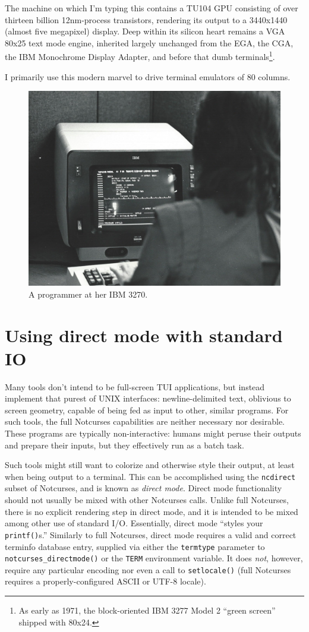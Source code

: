 \documentclass[letterpaper,10pt]{article}
\begin{document}
The machine on which I'm typing this contains a
TU104 GPU consisting of over thirteen billion 12nm-process transistors,
rendering its output to a 3440x1440 (almost five megapixel) display. Deep
within its silicon heart remains a VGA 80x25 text mode engine, inherited
largely unchanged from the EGA, the CGA, the IBM Monochrome Display Adapter,
and before that dumb terminals\footnote{As early as 1971, the block-oriented
IBM 3277 Model 2 ``green screen'' shipped with 80x24.}.


I primarily use this modern marvel to drive terminal emulators of 80 columns.

\vfill
\begin{figure}[!htbp]
\centering
\includegraphics[width=.6\linewidth]{media/ibm3270.jpg}
\caption{A programmer at her IBM 3270.}
\end{figure}

\newpage

\section{Using direct mode with standard I\/O}

Many tools don't intend to be full-screen TUI applications, but instead
implement that purest of UNIX interfaces: newline-delimited text, oblivious
to screen geometry, capable of being fed as input to other, similar programs.
For such tools, the full Notcurses capabilities are neither necessary nor
desirable. These programs are typically non-interactive: humans might peruse
their outputs and prepare their inputs, but they effectively run as a batch
task.

 Such tools might still want to colorize and otherwise style their output, at
least when being output to a terminal. This can be accomplished using the
\texttt{ncdirect} subset of Notcurses, and is known as \textit{direct mode}. Direct
mode functionality should not usually be mixed with other Notcurses calls.
Unlike full Notcurses, there is no explicit rendering step in direct mode, and
it is intended to be mixed among other use of standard I/O. Essentially, direct
mode ``styles your \texttt{printf()}s.'' Similarly to full Notcurses, direct mode
requires a valid and correct terminfo database entry, supplied via either the
\texttt{termtype} parameter to \texttt{notcurses\_directmode()} or the \texttt{TERM} environment
variable. It does \textit{not}, however, require any particular encoding nor
even a call to \texttt{setlocale()} (full Notcurses requires a properly-configured
ASCII or UTF-8 locale).
\end{document}
